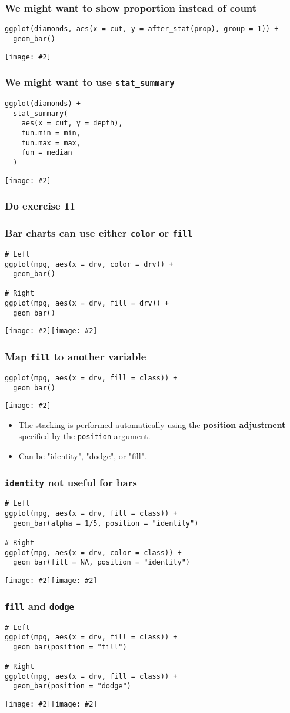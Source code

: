 \documentclass{beamer}
\newcommand{\bi}{\begin{itemize}}
\newcommand{\li}{\item}
\newcommand{\ei}{\end{itemize}}
\newcommand{\fig}[2]{\centerline{\texttt{[image: \#2]}}}
\newcommand{\figg}[2]{\texttt{[image: \#2]}}
\newcommand{\bfr}[1]{\begin{frame}[fragile]\frametitle{{ #1 }}}
\begin{document}
\bfr{We might want to show proportion instead of count}\scriptsize
\begin{verbatim}
ggplot(diamonds, aes(x = cut, y = after_stat(prop), group = 1)) + 
  geom_bar()
\end{verbatim}
\fig{.8}{unnamed-chunk-31-1.png}
\end{frame}



\bfr{We might want to use {\tt stat\_summary}}\scriptsize
\begin{verbatim}
ggplot(diamonds) + 
  stat_summary(
    aes(x = cut, y = depth),
    fun.min = min,
    fun.max = max,
    fun = median
  )
\end{verbatim}
\fig{.8}{unnamed-chunk-32-1.png}
\end{frame}

\bfr{Do exercise 11}
\end{frame}


\bfr{Bar charts can use either {\tt color} or {\tt fill}}\scriptsize
\begin{verbatim}
# Left
ggplot(mpg, aes(x = drv, color = drv)) + 
  geom_bar()

# Right
ggplot(mpg, aes(x = drv, fill = drv)) + 
  geom_bar()
\end{verbatim}
\figg{.5}{unnamed-chunk-34-1.png}\figg{.5}{unnamed-chunk-34-2.png}
\end{frame}



\bfr{Map {\tt fill} to another variable}\scriptsize
\begin{verbatim}
ggplot(mpg, aes(x = drv, fill = class)) + 
  geom_bar()
\end{verbatim}
\fig{.7}{unnamed-chunk-35-1.png}
\bi
\li The stacking is performed automatically using the {\bf position adjustment} specified by the 
\verb|position| argument.
\li Can be "identity", "dodge", or "fill".
\ei
\end{frame}


\bfr{{\tt identity} not useful for bars}\scriptsize
\begin{verbatim}
# Left
ggplot(mpg, aes(x = drv, fill = class)) + 
  geom_bar(alpha = 1/5, position = "identity")

# Right
ggplot(mpg, aes(x = drv, color = class)) + 
  geom_bar(fill = NA, position = "identity")
\end{verbatim}
\figg{.5}{unnamed-chunk-36-1.png}\figg{.5}{unnamed-chunk-36-2.png}
\end{frame}


\bfr{{\tt fill} and {\tt dodge}}\scriptsize
\begin{verbatim}
# Left
ggplot(mpg, aes(x = drv, fill = class)) + 
  geom_bar(position = "fill")

# Right
ggplot(mpg, aes(x = drv, fill = class)) + 
  geom_bar(position = "dodge")
\end{verbatim}
\figg{.5}{unnamed-chunk-37-1.png}\figg{.5}{unnamed-chunk-37-2.png}
\end{frame}
\end{document}
